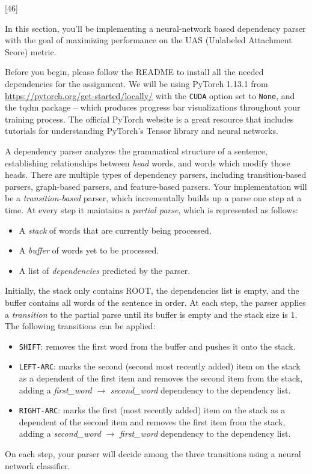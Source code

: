[46]

In this section, you'll be implementing a neural-network based dependency parser with the goal of maximizing performance on the UAS (Unlabeled Attachment Score) metric.\newline

Before you begin, please follow the README to install all the needed dependencies for the assignment. We will be using PyTorch 1.13.1 from \url{https://pytorch.org/get-started/locally/} with the \texttt{CUDA} option set to \texttt{None}, and the tqdm package -- which produces progress bar visualizations throughout your training process. The official PyTorch website is a great resource that includes tutorials for understanding PyTorch's Tensor library and neural networks. \newline

A dependency parser analyzes the grammatical structure of a sentence, establishing relationships between \textit{head} words, and words which modify those heads. There are multiple types of dependency parsers, including transition-based parsers, graph-based parsers, and feature-based parsers. Your implementation will be a {\it transition-based} parser, which incrementally builds up a parse one step at a time. At every step it maintains a \textit{partial parse}, which is represented as follows:
\begin{itemize}
\item A {\it stack} of words that are currently being processed.
\item A {\it buffer} of words yet to be processed.
\item A list of {\it dependencies} predicted by the parser.
\end{itemize}
Initially, the stack only contains ROOT, the dependencies list is empty, and the buffer contains all words of the sentence in order. At each step, the parser applies a {\it transition} to the partial parse until its buffer is empty and the stack size is 1. The following transitions can be applied:
\begin{itemize}
\item \texttt{SHIFT}: removes the first word from the buffer and pushes it onto the stack.
\item \texttt{LEFT-ARC}: marks the second (second most recently added) item on the stack as a dependent of the first item and removes the second item from the stack, adding a \textit{first\_word} $\rightarrow$ \textit{second\_word} dependency to the dependency list.
\item \texttt{RIGHT-ARC}: marks the first (most recently added) item on the stack as a dependent of the second item and removes the first item from the stack, adding a \textit{second\_word} $\rightarrow$ \textit{first\_word} dependency to the dependency list.
\end{itemize}
On each step, your parser will decide among the three transitions using a neural network classifier.

